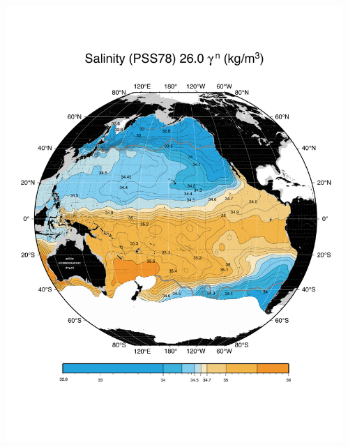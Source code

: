 \documentclass{beamer}
\begin{document}

\begin{frame}[plain,t]

    \begin{columns}
      \begin{column}{0.33\textwidth}
        \includegraphics[width=\textwidth]{salnty_isopyc_final_pdf/pac2600_salnty_final_color.pdf}  
       \end{column}
      \begin{column}{0.33\textwidth}

\end{column}
\end{columns}
\end{frame}
\end{document}
